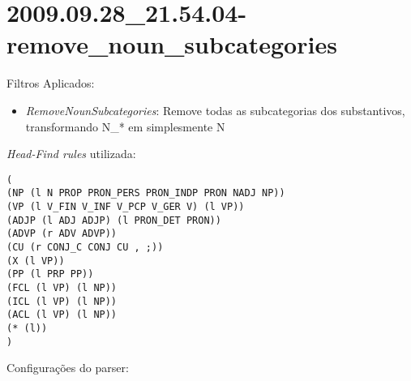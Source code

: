 \section{2009.09.28_21.54.04-remove_noun_subcategories} %
\label{sec:exp:2009.09.28_21.54.04-remove_noun_subcategories}

Filtros Aplicados:

\begin{itemize}
  
  \item{\emph{RemoveNounSubcategories}: Remove todas as subcategorias dos substantivos, transformando N_* em simplesmente N}
  
\end{itemize}

\emph{Head-Find rules} utilizada:

\scriptsize
\begin{verbatim}
(
(NP (l N PROP PRON_PERS PRON_INDP PRON NADJ NP))
(VP (l V_FIN V_INF V_PCP V_GER V) (l VP))
(ADJP (l ADJ ADJP) (l PRON_DET PRON))
(ADVP (r ADV ADVP))
(CU (r CONJ_C CONJ CU , ;))
(X (l VP))
(PP (l PRP PP))
(FCL (l VP) (l NP))
(ICL (l VP) (l NP))
(ACL (l VP) (l NP))
(* (l))
)

\end{verbatim}

\normalsize

Configurações do parser:

